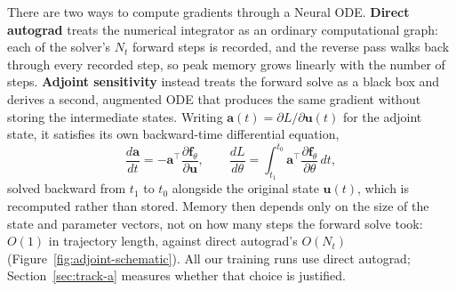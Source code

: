 There are two ways to compute gradients through a Neural ODE. \textbf{Direct
autograd} treats the numerical integrator as an ordinary computational
graph: each of the solver's $N_t$ forward steps is recorded, and the reverse
pass walks back through every recorded step, so peak memory grows linearly
with the number of steps. \textbf{Adjoint sensitivity}
\cite{chen2018neuralode} instead treats the forward solve as a black box and
derives a second, augmented ODE that produces the same gradient without
storing the intermediate states. Writing $\mathbf{a}(t) = \partial
L/\partial\mathbf{u}(t)$ for the adjoint state, it satisfies its own
backward-time differential equation,
\begin{equation}
\frac{d\mathbf{a}}{dt} = -\mathbf{a}^\top\frac{\partial \mathbf{f}_\theta}{\partial\mathbf{u}},
\qquad
\frac{dL}{d\theta} = \int_{t_1}^{t_0}\mathbf{a}^\top\frac{\partial\mathbf{f}_\theta}{\partial\theta}\,dt,
\label{eq:adjoint}
\end{equation}
solved backward from $t_1$ to $t_0$ alongside the original state
$\mathbf{u}(t)$, which is recomputed rather than stored. Memory then depends
only on the size of the state and parameter vectors, not on how many steps
the forward solve took: $O(1)$ in trajectory length, against direct
autograd's $O(N_t)$ (Figure~\ref{fig:adjoint-schematic}). All our training
runs use direct autograd; Section~\ref{sec:track-a} measures whether that
choice is justified.

